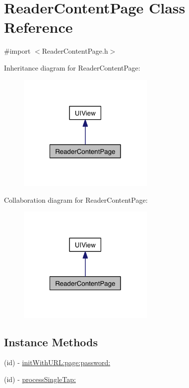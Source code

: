 \hypertarget{interface_reader_content_page}{\section{Reader\-Content\-Page Class Reference}
\label{d2/dad/interface_reader_content_page}
}


{\ttfamily \#import $<$Reader\-Content\-Page.\-h$>$}



Inheritance diagram for Reader\-Content\-Page\-:
\nopagebreak
\begin{figure}[H]
\begin{center}
\leavevmode
\includegraphics[width=186pt]{d0/dec/interface_reader_content_page__inherit__graph}
\end{center}
\end{figure}


Collaboration diagram for Reader\-Content\-Page\-:
\nopagebreak
\begin{figure}[H]
\begin{center}
\leavevmode
\includegraphics[width=186pt]{d7/d69/interface_reader_content_page__coll__graph}
\end{center}
\end{figure}
\subsection*{Instance Methods}
\begin{DoxyCompactItemize}
\item 
(id) -\/ \hyperlink{interface_reader_content_page_a9189b3f021220df23b6ee0ba0511910d}{init\-With\-U\-R\-L\-:page\-:password\-:}
\item 
(id) -\/ \hyperlink{interface_reader_content_page_ac3bf445eb3b43536fc1276061744c7f0}{process\-Single\-Tap\-:}
\end{DoxyCompactItemize}


